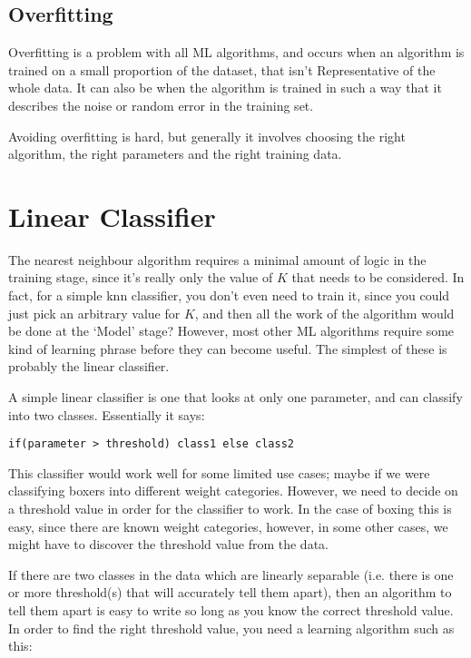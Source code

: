 \subsection{Overfitting}

Overfitting is a problem with all ML algorithms, and occurs when an algorithm is
trained on a small proportion of the dataset, that isn't Representative of the
whole data. It can also be when the algorithm is trained in such a way that it
describes the noise or random error in the training set.

Avoiding overfitting is hard, but generally it involves choosing the right
algorithm, the right parameters and the right training data.

\section{Linear Classifier}

The nearest neighbour algorithm requires a minimal amount of logic in the
training stage, since it's really only the value of $K$ that needs to be
considered. In fact, for a simple knn classifier, you don't even need to train
it, since you could just pick an arbitrary value for $K$, and then all the work
of the algorithm would be done at the `Model' stage? However, most other ML
algorithms require some kind of learning phrase before they can become useful.
The simplest of these is probably the linear classifier.

A simple linear classifier is one that looks at only one parameter, and can
classify into two classes. Essentially it says:

\begin{lstlisting}[label=linearClassifier, caption=A simple linear classifier]
if(parameter > threshold) class1 else class2
\end{lstlisting}

This classifier would work well for some limited use cases; maybe if we were
classifying boxers into different weight categories. However, we need to decide
on a threshold value in order for the classifier to work. In the case of boxing
this is easy, since there are known weight categories, however, in some other
cases, we might have to discover the threshold value from the data.

If there are two classes in the data which are linearly separable (i.e. there is
one or more threshold(s) that will accurately tell them apart), then an
algorithm to tell them apart is easy to write so long as you know the correct
threshold value. In order to find the right threshold value, you need a learning
algorithm such as this:

